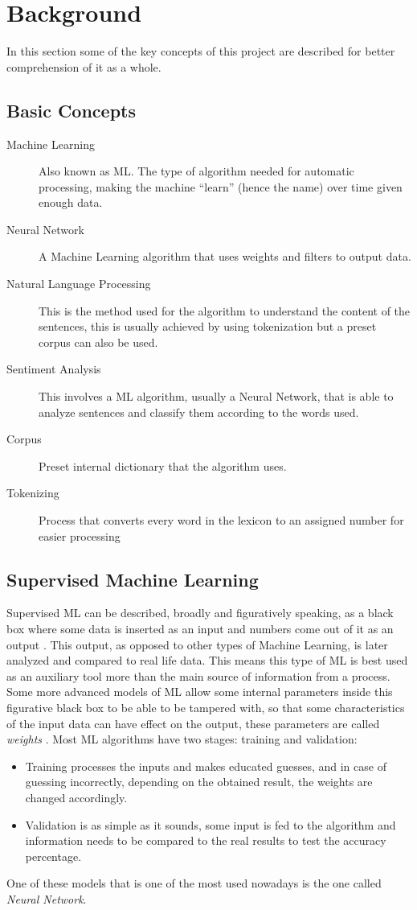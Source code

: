 \documentclass[review]{elsarticle} %
\begin{document}
\section{Background}
In this section some of the key concepts of this project are described for better comprehension of it as a whole.
\subsection{Basic Concepts}
\begin{description}
	\item[Machine Learning]{Also known as ML. The type of algorithm needed for automatic processing, making the machine ``learn'' (hence the name) over time given enough data.}
	\item[Neural Network]{A Machine Learning algorithm that uses weights and filters to output data.}
	\item[Natural Language Processing]{This is the method used for the algorithm to understand the content of the sentences, this is usually achieved by using tokenization but a preset corpus can also be used.}	
	\item[Sentiment Analysis]{This involves a ML algorithm, usually a Neural Network, that is able to analyze sentences and classify them according to the words used.}
	\item[Corpus]{Preset internal dictionary that the algorithm uses.}
	\item[Tokenizing]{Process that converts every word in the lexicon to an assigned number for easier processing}
\end{description}

\subsection{Supervised Machine Learning}
Supervised ML can be described, broadly and figuratively speaking, as a black box where some data is inserted as an input and numbers come out of it as an output \citep{rf8}. This output, as opposed to other types of Machine Learning, is later analyzed and compared to real life data. This means this type of ML is best used as an auxiliary tool more than the main source of information from a process.
Some more advanced models of ML allow some internal parameters inside this figurative black box to be able to be tampered with, so that some characteristics of the input data can have effect on the output, these parameters are called \textit{weights} \citep{rf9}.
Most ML algorithms have two stages: training and validation:
\begin{itemize}
\item Training processes the inputs and makes educated guesses, and in case of guessing incorrectly, depending on the obtained result, the weights are changed accordingly.
\item Validation is as simple as it sounds, some input is fed to the algorithm and information needs to be compared to the real results to test the accuracy percentage.
\end{itemize}
One of these models that is one of the most used nowadays is the one called \textit{Neural Network}.
\end{document}
